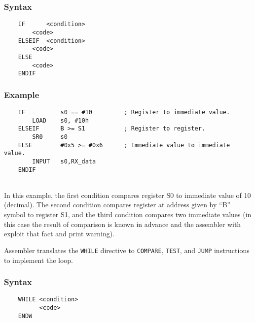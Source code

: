         \subsubsection{Syntax}
            \verb'    IF      <condition>'\\
            \verb'        <code>'\\
            \verb'    ELSEIF  <condition>'\\
            \verb'        <code>'\\
            \verb'    ELSE'\\
            \verb'        <code>'\\
            \verb'    ENDIF'

        \subsubsection{Example}
            \verb'    IF          s0 == #10         ; Register to immediate value.'\\
            \verb'        LOAD    s0, #10h'\\
            \verb'    ELSEIF      B >= S1           ; Register to register.'\\
            \verb'        SR0     s0'\\
            \verb'    ELSE        #0x5 >= #0x6      ; Immediate value to immediate value.'\\
            \verb'        INPUT   s0,RX_data'\\
            \verb'    ENDIF'

            ~\\In this example, the first condition compares register S0 to immediate value of 10 (decimal). The second condition compares register at address given by ``B'' symbol to register S1, and the third condition compares two immediate values (in this case the result of comparison is known in advance and the assembler with exploit that fact and print warning).

        Assembler translates the \texttt{WHILE} directive to \texttt{COMPARE}, \texttt{TEST}, and \texttt{JUMP} instructions to implement the loop.

        \subsubsection{Syntax}
            \verb'    WHILE <condition>'\\
            \verb'          <code>'\\
            \verb'    ENDW'

